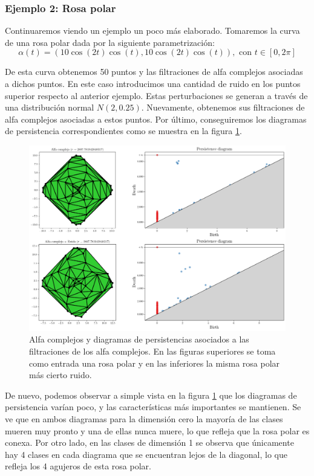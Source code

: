 \subsubsection{Ejemplo 2: Rosa polar}
Continuaremos viendo un ejemplo un poco más elaborado. Tomaremos la curva de una rosa polar dada por la siguiente parametrización:
\[
\alpha(t)= (10\cos(2t)\cos(t), 10\cos(2t)\cos(t)), \text{ con } t\in [0,2\pi]
\]

De esta curva obtenemos 50 puntos y las filtraciones de alfa complejos asociadas a dichos puntos. En este caso introducimos una cantidad de ruido en los puntos superior respecto al anterior ejemplo. Estas perturbaciones se generan a través de una distribución normal $N(2, 0.25)$. Nuevamente, obtenemos sus filtraciones de alfa complejos asociadas a estos puntos. Por último, conseguiremos los diagramas de persistencia correspondientes como se muestra en la figura \ref{ref:persEj2}.

\begin{figure}[!ht]
\centering
\includegraphics[width=\textwidth]{../code/output/ejemplo2.png} 
\caption{Alfa complejos y diagramas de persistencias asociados a las filtraciones de los alfa complejos. En las figuras superiores se toma como entrada una rosa polar y en las inferiores la misma rosa polar más cierto ruido.}
\label{ref:persEj2}
\end{figure} 

De nuevo, podemos observar a simple vista en la figura \ref{ref:persEj2} que los diagramas de persistencia varían poco, y las características más importantes se mantienen. Se ve que en ambos diagramas para la dimensión cero la mayoría de las clases mueren muy pronto y una de ellas nunca muere, lo que refleja que la rosa polar es conexa. Por otro lado, en las clases de dimensión 1 se observa que únicamente hay 4 clases en cada diagrama que se encuentran lejos de la diagonal, lo que refleja los 4 agujeros de esta rosa polar.

